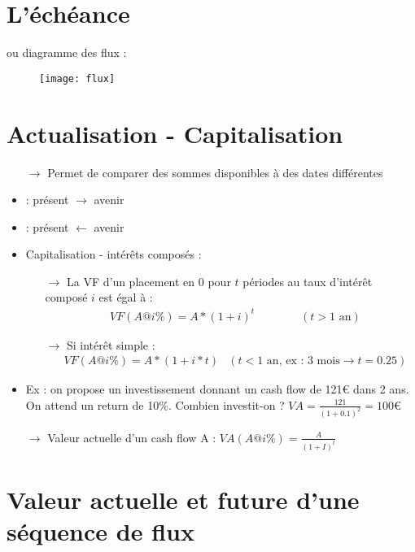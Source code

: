 \section{L'échéance}

ou diagramme des flux :
\begin{figure}[H]
    \centering
    \texttt{[image: flux]}
\end{figure}

\section{Actualisation - Capitalisation}

\begin{itemize}
    \item[$\rightarrow$] Permet de comparer des sommes disponibles à des dates différentes
    \item {} : présent $\rightarrow$ avenir
    \item {} : présent $\leftarrow$ avenir
    \item Capitalisation - intérêts composés :
    \begin{itemize}
        \item[$\rightarrow$] La VF d'un placement en $0$ pour $t$ périodes au taux d'intérêt composé $i$ est égal à :
        \begin{align*}
            &VF(A@i\%) = A * (1 + i)^t &&&&& (t > 1 \text{ an})
        \end{align*}
    \end{itemize}
    \begin{itemize}
        \item[$\rightarrow$] Si intérêt simple :
        \begin{align*}
            &VF(A@i\%) = A * (1 + i * t) & (t < 1 \text{ an, ex : 3 mois}\rightarrow t = 0.25)
        \end{align*}
    \end{itemize}
    \item Ex : on propose un investissement donnant un cash flow de 121€ dans 2 ans. On attend un return de 10\%. Combien investit-on ? $VA = \frac{121}{(1 + 0.1)^2} = 100$€
    \item[$\rightarrow$] Valeur actuelle d'un cash flow A : $VA (A@i\%) = \frac{A}{(1 + I)^t}$
\end{itemize}

\section{Valeur actuelle et future d'une séquence de flux}

